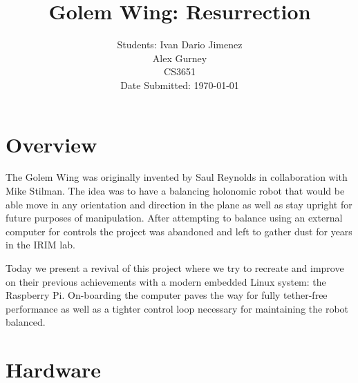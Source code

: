 \documentclass[12pt,conference,onecolumn,titlepage]{IEEEtran} %
\begin{document}
\title{Golem Wing: Resurrection}
\author{Students: Ivan Dario Jimenez\\
Alex Gurney \\
CS3651\\
Date Submitted: \today \\}

\maketitle

\section{Overview}
\label{sec:overview}
The Golem Wing was originally invented by Saul Reynolds in collaboration with Mike Stilman. The idea was to have a balancing holonomic robot that would be able move in any orientation and direction in the plane as well as stay upright for future purposes of manipulation. After attempting to balance using an external computer for controls the project was abandoned and left to gather dust for years in the IRIM lab.\par
Today we present a revival of this project where we try to recreate and improve on their previous achievements with a modern embedded Linux system: the Raspberry Pi. On-boarding the computer paves the way for fully tether-free performance as well as a tighter control loop necessary for maintaining the robot balanced.\par
\section{Hardware}
\label{sec:hardware}
\end{document}

